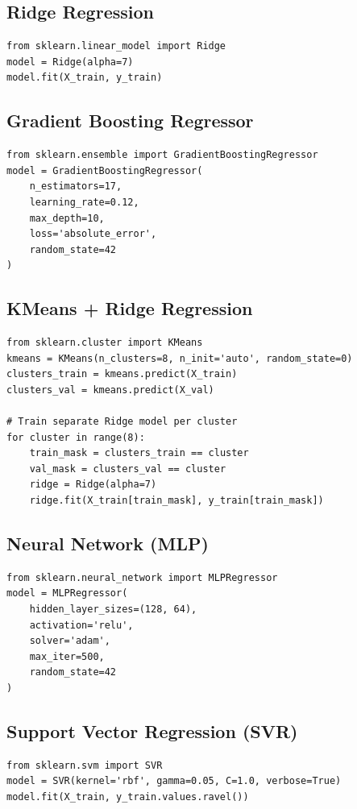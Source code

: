\documentclass[11pt,a4paper]{article}
\begin{document}
\subsection{Ridge Regression}
\begin{lstlisting}
from sklearn.linear_model import Ridge
model = Ridge(alpha=7)
model.fit(X_train, y_train)
\end{lstlisting}

\subsection{Gradient Boosting Regressor}
\begin{lstlisting}
from sklearn.ensemble import GradientBoostingRegressor
model = GradientBoostingRegressor(
    n_estimators=17,
    learning_rate=0.12,
    max_depth=10,
    loss='absolute_error',
    random_state=42
)
\end{lstlisting}

\subsection{KMeans + Ridge Regression}
\begin{lstlisting}
from sklearn.cluster import KMeans
kmeans = KMeans(n_clusters=8, n_init='auto', random_state=0)
clusters_train = kmeans.predict(X_train)
clusters_val = kmeans.predict(X_val)

# Train separate Ridge model per cluster
for cluster in range(8):
    train_mask = clusters_train == cluster
    val_mask = clusters_val == cluster
    ridge = Ridge(alpha=7)
    ridge.fit(X_train[train_mask], y_train[train_mask])
\end{lstlisting}

\subsection{Neural Network (MLP)}
\begin{lstlisting}
from sklearn.neural_network import MLPRegressor
model = MLPRegressor(
    hidden_layer_sizes=(128, 64),
    activation='relu',
    solver='adam',
    max_iter=500,
    random_state=42
)
\end{lstlisting}

\subsection{Support Vector Regression (SVR)}
\begin{lstlisting}
from sklearn.svm import SVR
model = SVR(kernel='rbf', gamma=0.05, C=1.0, verbose=True)
model.fit(X_train, y_train.values.ravel())
\end{lstlisting}
\end{document}

